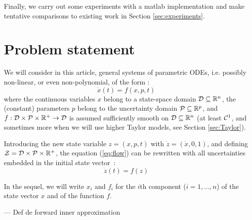 \documentclass{sig-alternate-05-2015} %
\newcommand\ForAuthors[1]%
 {\par\smallskip                     %
  \begin{center}%
   \fbox%
   {\parbox{0.9\linewidth}%
    {\raggedright\sc--- #1}%
   }%
  \end{center}%
  \par\smallskip                     %
 }
\def\R{{\mathbb R}}
\newcommand{\addTODO}[1]{\addcontentsline{tdo}{toc}{#1}}
\newcommand{\TODO}[1]{{\bf{\scriptsize #1}\addTODO{#1}}}
\newcommand{\SP}[1]{\TODO{Sylvie : #1}}
\begin{document}
Finally, we carry out some 
experiments with a matlab implementation and make tentative comparisons to existing work in Section \ref{sec:experiments}. 



\section{Problem statement}

We will consider in this article, general systems of parametric ODEs, i.e. possibly non-linear, or
even non-polyno\-mial, of the form : 
\begin{equation}
\dot{x}(t) = f(x,p,t)
\label{eq:flow}
\end{equation}
\noindent where the continuous variables $x$ belong to a state-space domain 
${\cal D} \subseteq \R^n$, the (constant) parameters $p$ belong to the uncertainty domain
${\cal P} \subseteq \R^p$, and 
$f: {\cal D} \times {\cal P} \times \R^+ \rightarrow {\cal D}$ is assumed sufficiently smooth 
on ${\cal D} \subseteq \R^n$ (at least ${\cal C}^1$, and sometimes more when we will use higher
Taylor models, see Section \ref{sec:Taylor}).

Introducing the new state variable $z=(x,p,t)$ with $\dot z = (\dot x,0,1)$, and defining ${\cal Z} = {\cal D} \times {\cal P} \times \R^+$,
the equation (\ref{eq:flow}) can be rewritten with all uncertainties embedded in the initial state vector~:
\begin{equation} \dot z(t) = f(z)
\label{eq:flowb}
\end{equation}

In the sequel, we will write $x_i$ and $f_i$ for the $i$th component ($i=1,\ldots,n$) of
the state vector $x$ and of the function $f$. 


\ForAuthors{Def de forward inner approximation}

\end{document}
